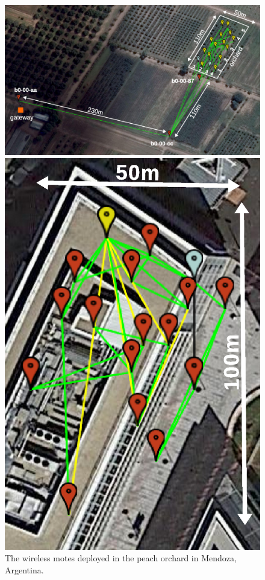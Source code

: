 \documentclass{elsarticle}
\begin{document}
\begin{figure}
    \begin{minipage}[b]{0.66\textwidth}
        \centering
        \includegraphics[width=\textwidth]{map_annotated}
        \caption{The wireless motes deployed in the peach orchard in Mendoza, Argentina.\newline}
        \label{fig:peach_map}
    \end{minipage}
    \hfill
    \begin{minipage}[b]{0.3\textwidth}
        \includegraphics[width=\textwidth]{evalab_map_annotated.eps}

\end{minipage}
\end{figure}
\end{document}
